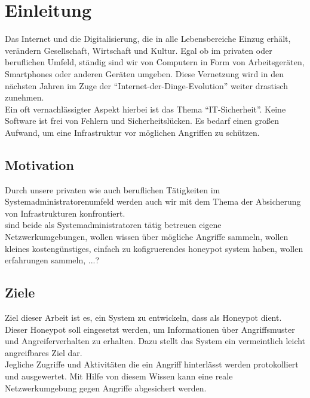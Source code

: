 \chapter{Einleitung}
\label{sec:einleitung}

Das Internet und die Digitalisierung, die in alle Lebensbereiche Einzug erhält, verändern Gesellschaft, Wirtschaft und Kultur.
Egal ob im privaten oder beruflichen Umfeld, ständig sind wir von Computern in Form von Arbeitsgeräten, Smartphones oder anderen Geräten umgeben.
Diese Vernetzung wird in den nächsten Jahren im Zuge der "`Internet-der-Dinge-Evolution"' weiter drastisch zunehmen.\\



Ein oft vernachlässigter Aspekt hierbei ist das Thema "`IT-Sicherheit"'. Keine Software ist frei von Fehlern und Sicherheitslücken. Es bedarf einen großen Aufwand, um eine Infrastruktur vor möglichen Angriffen zu schützen.


\section{Motivation}
\label{subsec:Motivation}
Durch unsere privaten wie auch beruflichen Tätigkeiten im Systemadministratorenumfeld werden auch wir mit dem Thema der Absicherung von Infrastrukturen konfrontiert.\\


sind beide als Systemadministratoren tätig betreuen eigene Netzwerkumgebungen, wollen wissen über mögliche Angriffe sammeln, wollen kleines kostengünstiges, einfach zu kofigruerendes honeypot system haben, wollen erfahrungen sammeln, ...?


\section{Ziele}
\label{subsec:Ziele}
Ziel dieser Arbeit ist es, ein System zu entwickeln, dass als Honeypot dient. Dieser Honeypot soll eingesetzt werden, um Informationen über Angriffsmuster und Angreiferverhalten zu erhalten. Dazu stellt das System ein vermeintlich leicht angreifbares Ziel dar.\\

Jegliche Zugriffe und Aktivitäten die ein Angriff hinterlässt werden protokolliert und ausgewertet. 
Mit Hilfe von diesem Wissen kann eine reale Netzwerkumgebung gegen Angriffe abgesichert werden.\\

